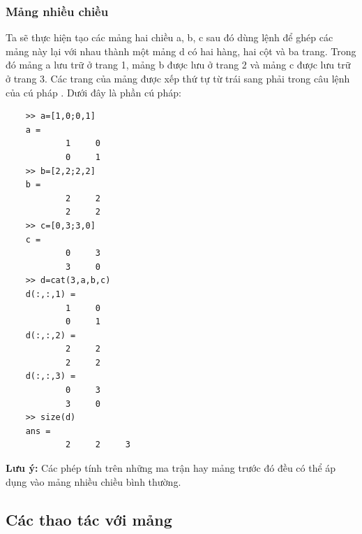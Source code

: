 \documentclass[12pt,a4paper]{article}
\begin{document}
\subsubsection{Mảng nhiều chiều}
Ta sẽ thực hiện tạo các mảng hai chiều a, b, c sau đó dùng lệnh  để ghép các mảng này lại với nhau thành một mảng d có hai hàng, hai cột và ba trang. Trong đó mảng a lưu trữ ở trang 1, mảng b được lưu ở trang 2 và mảng c được lưu trữ ở trang 3. Các trang của mảng được xếp thứ tự từ trái sang phải trong câu lệnh của cú pháp . Dưới đây là phần cú pháp:
\begin{lstlisting}
	>> a=[1,0;0,1]
	a =
     		1     0
     		0     1
	>> b=[2,2;2,2]
	b =
     		2     2
     		2     2
	>> c=[0,3;3,0]
	c =
     		0     3
     		3     0
	>> d=cat(3,a,b,c)
	d(:,:,1) =
     		1     0
     		0     1
	d(:,:,2) =
     		2     2
     		2     2
	d(:,:,3) =
     		0     3
     		3     0
	>> size(d)
	ans =
     		2     2     3
\end{lstlisting}
\textbf{Lưu ý:} Các phép tính trên những ma trận hay mảng trước đó đều có thể áp dụng vào mảng nhiều chiều bình thường.
\subsection{Các thao tác với mảng}
\end{document}
